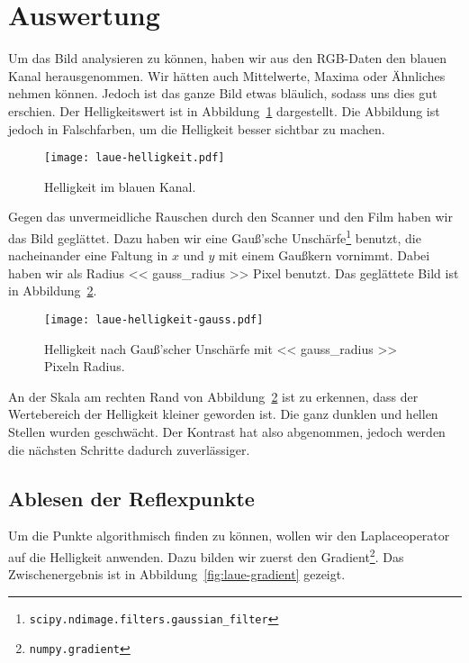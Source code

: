 \section{Auswertung}

Um das Bild analysieren zu können, haben wir aus den RGB-Daten den blauen Kanal
herausgenommen. Wir hätten auch Mittelwerte, Maxima oder Ähnliches nehmen
können. Jedoch ist das ganze Bild etwas bläulich, sodass uns dies gut
erschien. Der Helligkeitswert ist in Abbildung~\ref{fig:laue-helligkeit}
dargestellt. Die Abbildung ist jedoch in Falschfarben, um die Helligkeit besser
sichtbar zu machen.

\begin{figure}[htbp]
    \centering
    \texttt{[image: laue-helligkeit.pdf]}
    \caption{%
        Helligkeit im blauen Kanal.
    }
    \label{fig:laue-helligkeit}
\end{figure}

Gegen das unvermeidliche Rauschen durch den Scanner und den Film haben wir das
Bild geglättet. Dazu haben wir eine Gauß'sche
Unschärfe\footnote{\texttt{scipy.ndimage.filters.gaussian\_filter}} benutzt, die
nacheinander eine Faltung in  $x$ und $y$ mit einem Gaußkern vornimmt. Dabei
haben wir als Radius << gauss_radius >> Pixel benutzt. Das geglättete Bild ist
in Abbildung~\ref{fig:laue-gauss}.

\begin{figure}[htbp]
    \centering
    \texttt{[image: laue-helligkeit-gauss.pdf]}
    \caption{%
        Helligkeit nach Gauß'scher Unschärfe mit << gauss_radius >> Pixeln
        Radius.
    }
    \label{fig:laue-gauss}
\end{figure}

An der Skala am rechten Rand von Abbildung~\ref{fig:laue-gauss} ist zu
erkennen, dass der Wertebereich der Helligkeit kleiner geworden ist. Die ganz
dunklen und hellen Stellen wurden geschwächt. Der Kontrast hat also abgenommen,
jedoch werden die nächsten Schritte dadurch zuverlässiger.

\subsection{Ablesen der Reflexpunkte}

Um die Punkte algorithmisch finden zu können, wollen wir den Laplaceoperator
auf die Helligkeit anwenden. Dazu bilden wir zuerst den
Gradient\footnote{\texttt{numpy.gradient}}. Das Zwischenergebnis ist in
Abbildung~\ref{fig:laue-gradient} gezeigt.

